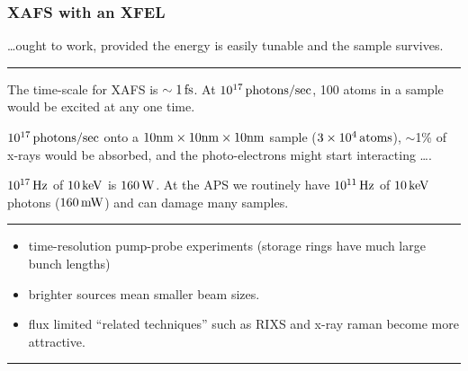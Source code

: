 
\begin{frame} \frametitle{XAFS with an XFEL}
  \small
  \begin{cenpage}{100mm}\setlength{\baselineskip}{11pt}
    \vspace{1mm}
    
    \ldots ought to work, provided the energy is easily tunable and the
    sample survives.

    \vmm     \hrule     \vmm
    
    {}
    
    The time-scale for XAFS is $\sim 1\rm\, fs$.  At $10^{17} \rm\,
    photons/sec$, 100 atoms in a sample would be excited at any one time.
        
    \vmm
    
    $10^{17} \rm\, photons/sec$ onto a $\rm 10nm \times 10 nm \times 10 nm$
    sample ($3\times 10^4\rm\, atoms$), $\sim$1\% of x-rays would be
    absorbed, and the photo-electrons might start interacting \ldots.
    
     $10^{17}
    \rm\, Hz$ of $ 10 \rm \,keV$ is $160 \rm\, W $.  At the APS we
    routinely have $10^{11} \rm\, Hz$ of $ 10 \rm \,keV$ photons ($160
    \rm\, mW $) and can damage many samples.

    \vmm     \hrule     \vmm
    
    {}
    
    \begin{itemize}
    \item time-resolution pump-probe experiments  (storage rings have much large bunch lengths)
    \item brighter sources mean smaller beam sizes.

    \item flux limited ``related techniques'' such as RIXS and x-ray raman
      become more attractive.

    \end{itemize}

    \vmm     \hrule    

  \end{cenpage}

\vfill
\end{frame} 
